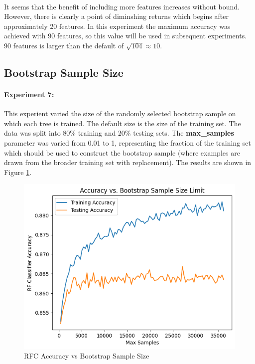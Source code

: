 \documentclass[12pt, letterpaper]{article}
\begin{document}
\paragraph*{}It seems that the benefit of including more features increases without
bound. However, there is clearly a point of diminshing returns which begins after
approximately 20 features. In this experiment the maximum accuracy was achieved
with 90 features, so this value will be used in subsequent experiments. 90 features
is larger than the default of $\sqrt{104} \approx 10$.

\subsection{Bootstrap Sample Size}
\paragraph*{Experiment 7:}This experient varied the size of the randomly selected
bootstrap sample on which each tree is trained. The default size is the size of the
training set. The data was split into 80\% training and 20\% testing sets. The
\textbf{max\_samples} parameter was varied from 0.01 to 1, representing the fraction
of the training set which should be used to construct the bootstrap sample (where
examples are drawn from the broader training set with replacement). The
results are shown in Figure \ref{fig:rf6}.

\begin{figure}[ht]
    \centering
    \includegraphics[width=\textwidth]{rf/rf10.png} %
    \caption{RFC Accuracy vs Bootstrap Sample Size}
    \label{fig:rf6}
\end{figure}
\end{document}
